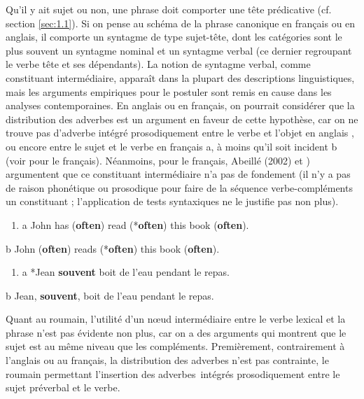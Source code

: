 Qu'il y ait sujet ou non, une phrase doit comporter une tête prédicative (cf. section \ref{sec:1.1}). Si on pense au schéma de la phrase canonique en français ou en anglais, il comporte un syntagme de type sujet-tête, dont les catégories sont le plus souvent un syntagme nominal et un syntagme verbal (ce dernier regroupant le verbe tête et ses dépendants). La notion de syntagme verbal, comme constituant intermédiaire, apparaît dans la plupart des descriptions linguistiques, mais les arguments empiriques pour le postuler sont remis en cause dans les analyses contemporaines. En anglais ou en français, on pourrait considérer que la distribution des adverbes est un argument en faveur de cette hypothèse, car on ne trouve pas d'adverbe intégré prosodiquement entre le verbe et l'objet en anglais , ou encore entre le sujet et le verbe en français a, à moins qu'il soit incident b (voir \citet{Pollock1989} pour le français). Néanmoins, pour le français, Abeillé (2002) et \citet{Creissels2006}) argumentent que ce constituant intermédiaire n'a pas de fondement (il n'y a pas de raison phonétique ou prosodique pour faire de la séquence verbe-compléments un constituant ; l'application de tests syntaxiques ne le justifie pas non plus). 


\begin{enumerate}
\item \label{bkm:Ref299313205}a  John has (\textbf{often}) read (*\textbf{often}) this book (\textbf{often}).  


\end{enumerate}
b  John (\textbf{often}) reads (*\textbf{often}) this book (\textbf{often}).


\begin{enumerate}
\item \label{bkm:Ref299314164}a  *Jean \textbf{souvent} boit de l'eau pendant le repas.


\end{enumerate}
b  Jean, \textbf{souvent}, boit de l'eau pendant le repas.

Quant au roumain, l'utilité d'un n{\oe}ud intermédiaire entre le verbe lexical et la phrase n'est pas évidente non plus, car on a des arguments qui montrent que le sujet est au même niveau que les compléments. Premièrement, contrairement à l'anglais ou au français, la distribution des adverbes n'est pas contrainte, le roumain permettant l'insertion des adverbes~intégrés prosodiquement entre le sujet préverbal et le verbe.


